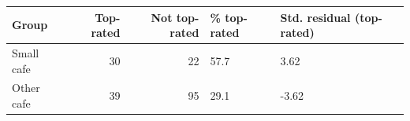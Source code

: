 \begin{tabular}{lrrll}
  \toprule
Group & Top-rated & Not top-rated & \% top-rated & Std. residual (top-rated) \\ 
  \midrule
Small cafe &  30 &  22 & 57.7 & 3.62 \\ 
  Other cafe &  39 &  95 & 29.1 & -3.62 \\ 
   \bottomrule
\end{tabular}
